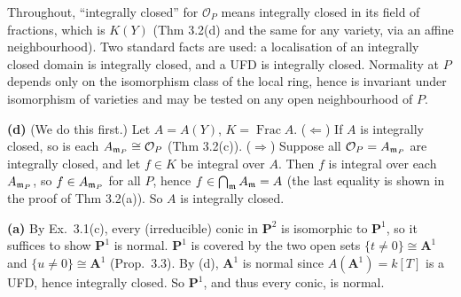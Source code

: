 \documentclass[11pt]{article}
\begin{document}
\pf
Throughout, ``integrally closed'' for $\mathcal{O}_P$ means integrally closed in its field of fractions, which is $K(Y)$ (Thm 3.2(d) and the same for any variety, via an affine neighbourhood). Two standard facts are used: a localisation of an integrally closed domain is integrally closed, and a UFD is integrally closed. Normality at $P$ depends only on the isomorphism class of the local ring, hence is invariant under isomorphism of varieties and may be tested on any open neighbourhood of $P$.

\textbf{(d)} (We do this first.) Let $A=A(Y)$, $K=\operatorname{Frac}A$. ($\Leftarrow$) If $A$ is integrally closed, so is each $A_{\mathfrak m_P}\cong\mathcal{O}_P$ (Thm 3.2(c)). ($\Rightarrow$) Suppose all $\mathcal{O}_P=A_{\mathfrak m_P}$ are integrally closed, and let $f\in K$ be integral over $A$. Then $f$ is integral over each $A_{\mathfrak m_P}$, so $f\in A_{\mathfrak m_P}$ for all $P$, hence $f\in\bigcap_{\mathfrak m}A_\mathfrak m=A$ (the last equality is shown in the proof of Thm 3.2(a)). So $A$ is integrally closed.

\textbf{(a)} By Ex.~3.1(c), every (irreducible) conic in $\mathbf P^2$ is isomorphic to $\mathbf P^1$, so it suffices to show $\mathbf P^1$ is normal. $\mathbf P^1$ is covered by the two open sets $\{t\ne0\}\cong\mathbf A^1$ and $\{u\ne0\}\cong\mathbf A^1$ (Prop.~3.3). By (d), $\mathbf A^1$ is normal since $A(\mathbf A^1)=k[T]$ is a UFD, hence integrally closed. So $\mathbf P^1$, and thus every conic, is normal.
\end{document}
